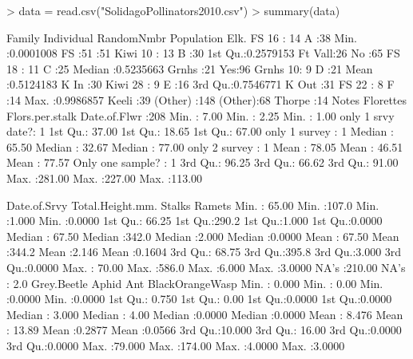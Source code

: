 \documentclass[11pt]{amsart}
\begin{document}
\begin{Schunk}
\begin{Sinput}
> data = read.csv("SolidagoPollinators2010.csv")
> summary(data)
\end{Sinput}
\begin{Soutput}
      Family      Individual   RandomNmbr          Population  Elk.   
 FS 16   : 14   A      :38   Min.   :0.0001008   FS     :51      :51  
 Kiwi 10 : 13   B      :30   1st Qu.:0.2579153   Ft Vall:26   No :65  
 FS 18   : 11   C      :25   Median :0.5235663   Grnhs  :21   Yes:96  
 Grnhs 10:  9   D      :21   Mean   :0.5124183   K In   :30           
 Kiwi 28 :  9   E      :16   3rd Qu.:0.7546771   K Out  :31           
 FS 22   :  8   F      :14   Max.   :0.9986857   Keeli  :39           
 (Other) :148   (Other):68                       Thorpe :14           
               Notes       Florettes      Flors.per.stalk   Date.of.Flwr   
                  :208   Min.   :  7.00   Min.   :  2.25   Min.   :  1.00  
 only 1 srvy date?:  1   1st Qu.: 37.00   1st Qu.: 18.65   1st Qu.: 67.00  
 only 1 survey    :  1   Median : 65.50   Median : 32.67   Median : 77.00  
 only 2 survey    :  1   Mean   : 78.05   Mean   : 46.51   Mean   : 77.57  
 Only one sample? :  1   3rd Qu.: 96.25   3rd Qu.: 66.62   3rd Qu.: 91.00  
                         Max.   :281.00   Max.   :227.00   Max.   :113.00  
                                                                           
  Date.of.Srvy    Total.Height.mm.     Stalks          Ramets      
 Min.   : 65.00   Min.   :107.0    Min.   :1.000   Min.   :0.0000  
 1st Qu.: 66.25   1st Qu.:290.2    1st Qu.:1.000   1st Qu.:0.0000  
 Median : 67.50   Median :342.0    Median :2.000   Median :0.0000  
 Mean   : 67.50   Mean   :344.2    Mean   :2.146   Mean   :0.1604  
 3rd Qu.: 68.75   3rd Qu.:395.8    3rd Qu.:3.000   3rd Qu.:0.0000  
 Max.   : 70.00   Max.   :586.0    Max.   :6.000   Max.   :3.0000  
 NA's   :210.00   NA's   :  2.0                                    
  Grey.Beetle         Aphid             Ant         BlackOrangeWasp 
 Min.   : 0.000   Min.   :  0.00   Min.   :0.0000   Min.   :0.0000  
 1st Qu.: 0.750   1st Qu.:  0.00   1st Qu.:0.0000   1st Qu.:0.0000  
 Median : 3.000   Median :  4.00   Median :0.0000   Median :0.0000  
 Mean   : 8.476   Mean   : 13.89   Mean   :0.2877   Mean   :0.0566  
 3rd Qu.:10.000   3rd Qu.: 16.00   3rd Qu.:0.0000   3rd Qu.:0.0000  
 Max.   :79.000   Max.   :174.00   Max.   :4.0000   Max.   :3.0000  
                                                                    

\end{Soutput}
\end{Schunk}
\end{document}
